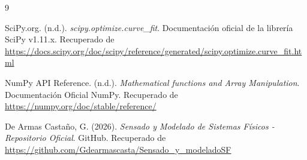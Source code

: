 \documentclass[12pt,a4paper]{article}
\begin{document}
\newpage
\begin{thebibliography}{9}

SciPy.org. (n.d.). 
\textit{scipy.optimize.curve\_fit}. Documentación oficial de la librería SciPy v1.11.x. Recuperado de \url{https://docs.scipy.org/doc/scipy/reference/generated/scipy.optimize.curve_fit.html}

NumPy API Reference. (n.d.). 
\textit{Mathematical functions and Array Manipulation}. Documentación Oficial NumPy. Recuperado de \url{https://numpy.org/doc/stable/reference/}

De Armas Castaño, G. (2026). 
\textit{Sensado y Modelado de Sistemas Físicos - Repositorio Oficial}. GitHub. Recuperado de \url{https://github.com/Gdearmascasta/Sensado_y_modeladoSF}

\end{thebibliography}
\end{document}

